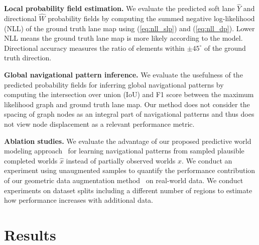 \documentclass[letterpaper, 10 pt, conference]{ieeeconf}
\begin{document}
\textbf{Local probability field estimation.}
We evaluate the predicted soft lane $\hat{Y}$ and directional $\hat{W}$ probability fields by computing the summed negative log-likelihood (NLL) of the ground truth lane map using (\ref{eq:nll_slp}) and (\ref{eq:nll_dp}). Lower NLL means the ground truth lane map is more likely according to the model. Directional accuracy measures the ratio of elements within $\pm 45^{\circ}$ of the ground truth direction.

\textbf{Global navigational pattern inference.}
We evaluate the usefulness of the predicted probability fields for inferring global navigational patterns by computing the intersection over union (IoU) and F1 score between the maximum likelihood graph and ground truth lane map.
Our method does not consider the spacing of graph nodes as an integral part of navigational patterns and thus does not view node displacement as a relevant performance metric.


\textbf{Ablation studies.}
We evaluate the advantage of our proposed predictive world modeling approach~\cite{karlsson2023pred_wm} for learning navigational patterns from sampled plausible completed worlds $\hat{x}$ instead of partially observed worlds $x$. We conduct an experiment using unaugmented samples to quantify the performance contribution of our geometric data augmentation method~\cite{karlsson2020dsla} on real-world data.
We conduct experiments on dataset splits including a different number of regions to estimate how performance increases with additional data.



\section{Results}
\end{document}
